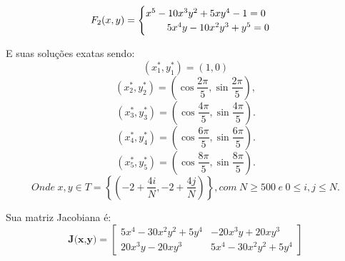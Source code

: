 \begin{equation}
    F_{2}(x,y) =
  \begin{cases}
    x^5 - 10x^3y^2 + 5xy^4 - 1= 0 \\
    \hspace{7.5mm}5x^4y - 10x^2y^3 + y^5 = 0
  \end{cases}
\end{equation}

E suas soluções exatas sendo:
$$
    (x^*_{1},y^*_{1}) = (1,0) 
$$
$$
    (x^*_{2},y^*_{2}) = (\cos\frac{2\pi}{5},\sin\frac{2\pi}{5}), 
$$
$$
    (x^*_{3},y^*_{3}) = (\cos\frac{4\pi}{5},\sin\frac{4\pi}{5}). 
$$
$$
    (x^*_{4},y^*_{4}) = (\cos\frac{6\pi}{5},\sin\frac{6\pi}{5}). 
$$
$$
    (x^*_{5},y^*_{5}) = (\cos\frac{8\pi}{5},\sin\frac{8\pi}{5}). 
$$
$$
   Onde \hspace{3pt} x,y \in T = \left\{ \left( -2 +\frac{4i}{N},-2 +\frac{4j}{N} \right) \right\}, com \hspace{3pt} N \ge 500 \hspace{3pt} e \hspace{3pt} 0 \le i,j \le N.
$$

Sua matriz Jacobiana é: 
$$\textbf{J(x,y)}=\begin{bmatrix}
5x^4 - 30x^2y^2 + 5y^4 & -20x^3y + 20xy^3 \\
20x^3y - 20xy^3 & 5x^4 - 30x^2y^2 + 5y^4
\end{bmatrix}$$